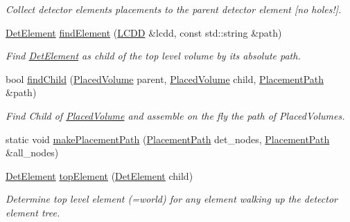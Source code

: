 \begin{DoxyCompactItemize}
\begin{DoxyCompactList}\small\item\em Collect detector elements placements to the parent detector element \mbox{[}no holes!\mbox{]}. \end{DoxyCompactList}\item 
\hyperlink{class_d_d4hep_1_1_geometry_1_1_det_element}{Det\+Element} \hyperlink{namespace_d_d4hep_1_1_geometry_1_1_detector_tools_a70cde605976780186eb6b226731ed380}{find\+Element} (\hyperlink{class_d_d4hep_1_1_geometry_1_1_l_c_d_d}{L\+C\+DD} \&lcdd, const std\+::string \&path)
\begin{DoxyCompactList}\small\item\em Find \hyperlink{class_d_d4hep_1_1_geometry_1_1_det_element}{Det\+Element} as child of the top level volume by it\textquotesingle{}s absolute path. \end{DoxyCompactList}\item 
bool \hyperlink{namespace_d_d4hep_1_1_geometry_1_1_detector_tools_a1bb51943ab0395ee0b1e4441b6a6b92a}{find\+Child} (\hyperlink{class_d_d4hep_1_1_geometry_1_1_placed_volume}{Placed\+Volume} parent, \hyperlink{class_d_d4hep_1_1_geometry_1_1_placed_volume}{Placed\+Volume} child, \hyperlink{namespace_d_d4hep_1_1_geometry_1_1_detector_tools_a6cc33285199e04dd336a33e6e62925e6}{Placement\+Path} \&path)
\begin{DoxyCompactList}\small\item\em Find Child of \hyperlink{class_d_d4hep_1_1_geometry_1_1_placed_volume}{Placed\+Volume} and assemble on the fly the path of Placed\+Volumes. \end{DoxyCompactList}\item 
static void \hyperlink{namespace_d_d4hep_1_1_geometry_1_1_detector_tools_adc948b938f4fbbdc46ad6f47f35059a0}{make\+Placement\+Path} (\hyperlink{namespace_d_d4hep_1_1_geometry_1_1_detector_tools_a6cc33285199e04dd336a33e6e62925e6}{Placement\+Path} det\+\_\+nodes, \hyperlink{namespace_d_d4hep_1_1_geometry_1_1_detector_tools_a6cc33285199e04dd336a33e6e62925e6}{Placement\+Path} \&all\+\_\+nodes)
\item 
\hyperlink{class_d_d4hep_1_1_geometry_1_1_det_element}{Det\+Element} \hyperlink{namespace_d_d4hep_1_1_geometry_1_1_detector_tools_aa2a3cf3ac7fbdabef840f02eb0d60d91}{top\+Element} (\hyperlink{class_d_d4hep_1_1_geometry_1_1_det_element}{Det\+Element} child)
\begin{DoxyCompactList}\small\item\em Determine top level element (=world) for any element walking up the detector element tree. \end{DoxyCompactList}\item 

\end{DoxyCompactItemize}
